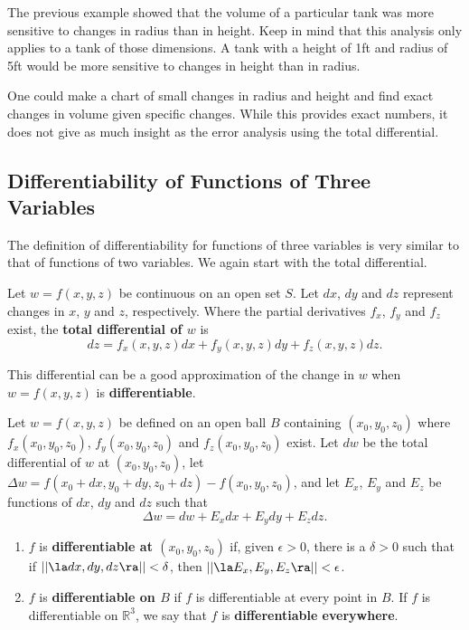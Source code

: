 The previous example showed that the volume of a particular tank was more sensitive to changes in radius than in height. Keep in mind that this analysis only applies to a tank of those dimensions. A tank with a height of 1ft and radius of 5ft would be more sensitive to changes in height than in radius.

One could make a chart of small changes in radius and height and find exact changes in volume given specific changes. While this provides exact numbers, it does not give as much insight as the error analysis using the total differential.

\subsection*{Differentiability of Functions of Three Variables}

The definition of differentiability for functions of three variables is very similar to that of functions of two variables. We again start with the total differential.

{Let $w=f(x,y,z)$ be continuous on an open set $S$. Let $dx$, $dy$ and $dz$ represent changes in $x$, $y$ and  $z$, respectively. Where the partial derivatives $f_x$, $f_y$ and $f_z$ exist, the \textbf{total differential of $w$} is
$$dz = f_x(x,y,z)dx + f_y(x,y,z)dy+f_z(x,y,z)dz.$$
}

This differential can be a good approximation of the change in $w$ when $w = f(x,y,z)$ is \textbf{differentiable}.

{Let $w=f(x,y,z)$ be defined on an open ball $B$ containing $(x_0,y_0,z_0)$ where $f_x(x_0,y_0,z_0)$, $f_y(x_0,y_0,z_0)$ and $f_z(x_0,y_0,z_0)$ exist. Let $dw$ be the total differential of $w$ at $(x_0,y_0,z_0)$, let $\Delta w = f(x_0+dx,y_0+dy,z_0+dz) - f(x_0,y_0,z_0)$, and let $E_x$, $E_y$ and $E_z$ be functions of $dx$, $dy$ and $dz$  such that
$$\Delta w = dw + E_xdx + E_ydy + E_zdz.$$
\begin{enumerate}
	\item $f$ is \textbf{differentiable at $(x_0,y_0,z_0)$} if, given $\epsilon >0$, there is a $\delta >0$ such that if $||\la dx,dy,dz\ra|| < \delta$, then $||\la E_x,E_y,E_z\ra|| < \epsilon$. 
	\item	$f$ is \textbf{differentiable on $B$} if $f$ is differentiable at every point in $B$. If $f$ is differentiable on $\mathbb{R}^3$, we say that $f$ is \textbf{differentiable everywhere}.
\end{enumerate}}

